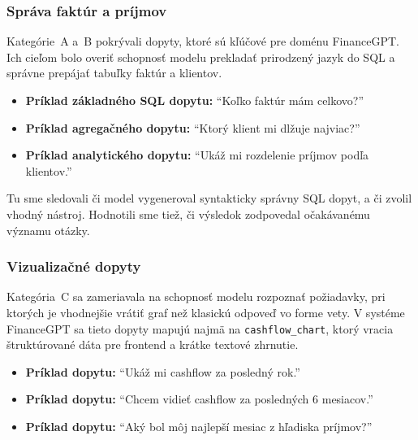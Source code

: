 \subsubsection{Správa faktúr a príjmov}

Kategórie~A a~B pokrývali dopyty, ktoré sú kľúčové pre doménu FinanceGPT. Ich
cieľom bolo overiť schopnosť modelu prekladať prirodzený jazyk do SQL a správne
prepájať tabuľky faktúr a klientov.

\begin{itemize}
	\item \textbf{Príklad základného SQL dopytu:} \enquote{Koľko faktúr mám celkovo?}

	\item \textbf{Príklad agregačného dopytu:} \enquote{Ktorý klient mi dlžuje najviac?}

	\item \textbf{Príklad analytického dopytu:} \enquote{Ukáž mi rozdelenie príjmov podľa klientov.}
\end{itemize}

Tu sme sledovali či model vygeneroval syntakticky správny SQL dopyt, a či zvolil
vhodný nástroj. Hodnotili sme tiež, či výsledok zodpovedal očakávanému významu
otázky.

\subsubsection{Vizualizačné dopyty}

Kategória~C sa zameriavala na schopnosť modelu rozpoznať požiadavky, pri ktorých
je vhodnejšie vrátiť graf než klasickú odpoveď vo forme vety. V systéme FinanceGPT
sa tieto dopyty mapujú najmä na \texttt{cashflow\_chart}, ktorý vracia štruktúrované
dáta pre frontend a krátke textové zhrnutie.

\begin{itemize}
	\item \textbf{Príklad dopytu:} \enquote{Ukáž mi cashflow za posledný rok.}

	\item \textbf{Príklad dopytu:} \enquote{Chcem vidieť cashflow za posledných 6 mesiacov.}

	\item \textbf{Príklad dopytu:} \enquote{Aký bol môj najlepší mesiac z hľadiska príjmov?}
\end{itemize}

